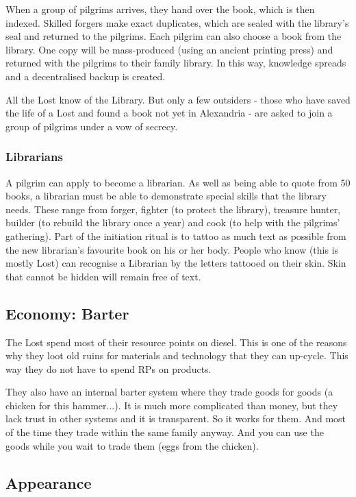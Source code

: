 When a group of pilgrims arrives, they hand over the book, which is then indexed. Skilled forgers make exact duplicates, which are sealed with the library's seal and returned to the pilgrims. Each pilgrim can also choose a book from the library. One copy will be mass-produced (using an ancient printing press) and returned with the pilgrims to their family library.
In this way, knowledge spreads and a decentralised backup is created.

All the Lost know of the Library. But only a few outsiders - those who have saved the life of a Lost and found a book not yet in Alexandria - are asked to join a group of pilgrims under a vow of secrecy.

\subsubsection{Librarians}

A pilgrim can apply to become a librarian. As well as being able to quote from 50 books, a librarian must be able to demonstrate special skills that the library needs. These range from forger, fighter (to protect the library), treasure hunter, builder (to rebuild the library once a year) and cook (to help with the pilgrims' gathering).
Part of the initiation ritual is to tattoo as much text as possible from the new librarian's favourite book on his or her body. People who know (this is mostly Lost) can recognise a Librarian by the letters tattooed on their skin.
Skin that cannot be hidden will remain free of text.

\subsection{Economy: Barter}
\label{sec:Barter}
The Lost spend most of their resource points on diesel. This is one of the reasons why they loot old ruins for materials and technology that they can up-cycle. This way they do not have to spend RPs on products.

They also have an internal barter system where they trade goods for goods (a chicken for this hammer...).
It is much more complicated than money, but they lack trust in other systems and it is transparent. So it works for them. And most of the time they trade within the same family anyway.
And you can use the goods while you wait to trade them (eggs from the chicken).

\subsection{Appearance}

